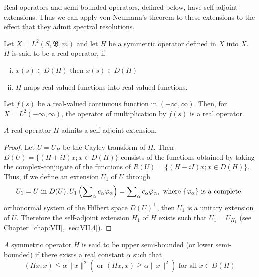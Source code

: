 Real operators and semi-bounded operators, defined below, have self-adjoint extensions. Thus we can apply von Neumann's theorem to these extensions to the effect that they admit spectral resolutions. 

\begin{definition}\label{def:XI.7.Definition.1} Let $X = L^2(S, \mathfrak{B}, m)$ and let $H$ be a symmetric operator defined in $X$ into $X$. $H$ is said to be a real operator, if \begin{enumerate}[i)]
\item $x(s) \in D(H)$ then $\overline{x(s)} \in D(H)$
\item $H$ maps real-valued functions into real-valued functions.
\end{enumerate}
\end{definition}

\begin{examplen} Let $f(s)$ be a real-valued continuous function in $(-\infty, \infty)$. Then, for $X = L^2(-\infty, \infty)$, the operator of multiplication by $f(s)$ is a real operator.

\end{examplen}
\begin{theorem}\label{thm:XI.7.Theorem.1} $A$ real operator $H$ admits a self-adjoint extension. 
\end{theorem}

\begin{proof}
 Let $U = U_H$ be the Cayley transform of $H$. Then $D(U) = \{(H + iI)x; x \in D(H)\}$ consists of the functions obtained by taking the complex-conjugate of the functions of $R(U) = \{(H - iI)x; x \in D(H)\}$. Thus, if we define an extension $U_1$ of $U$ through 
\begin{equation}U _{1} = U \text{ in } D (U), U _{1} \left(\sum\limits_{\alpha} c _{\alpha} \varphi_{\alpha}\right) = \sum\limits_{\alpha} c _{\alpha} \bar {\varphi} _{\alpha}, \text{ where } \{\varphi_{\alpha} \} \text{ is a complete } \notag\end{equation}
orthonormal system of the Hilbert space $D(U)^{\perp}$, 
then $U_{1}$ is a unitary extension of $U$. Therefore the self-adjoint extension $H_{1}$ of $H$ exists such that $U_{1} = U_{H_{1}}$ (see Chapter~\ref{chap:VII}, \ref{sec:VII.4}). 
\end{proof}

\begin{definition}\label{def:XI.7.Definition.2} $A$ symmetric operator $H$ is said to be upper semi-bounded (or lower semi-bounded) if there exists a real constant $\alpha$ such that 
\[
(H x, x) \leqq \alpha \| x \| ^{2} (\text{ or } (H x, x) \geqq \alpha \| x \| ^{2}) \text{ for all } x \in D (H)
\]
\end{definition}

